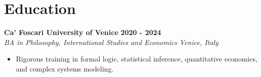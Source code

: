 \documentclass[10pt,a4paper]{article}
\newcommand{\role}[4]{%
  \textbf{#1} \hfill \textbf{#2}\\[1pt]%
  \textit{#3} \hfill \textit{#4}\\[2pt]%
}
\begin{document}
\section{Education}
\role{Ca' Foscari University of Venice}{2020 - 2024}{BA in Philosophy, International Studies and Economics}{Venice, Italy}
\begin{itemize}
  \item Rigorous training in formal logic, statistical inference, quantitative economics, and complex systems modeling.
\end{itemize}
\end{document}
